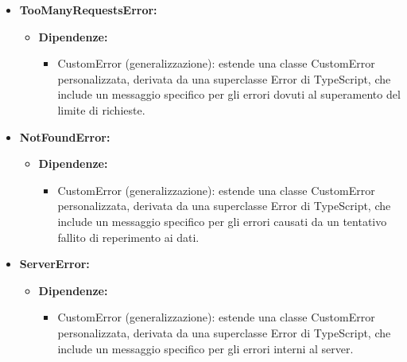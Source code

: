 \begin{itemize}
      \item \textbf{TooManyRequestsError:}
            \begin{itemize}
                  \item \textbf{Dipendenze:}
                        \begin{itemize}
                              \item CustomError (generalizzazione): estende una classe CustomError personalizzata,
                                    derivata da una superclasse Error di TypeScript, che include un messaggio
                                    specifico per gli errori dovuti al superamento del limite di richieste.
                        \end{itemize}
            \end{itemize}

      \item \textbf{NotFoundError:}
            \begin{itemize}
                  \item \textbf{Dipendenze:}
                        \begin{itemize}
                              \item CustomError (generalizzazione): estende una classe CustomError personalizzata,
                                    derivata da una superclasse Error di TypeScript, che include un messaggio
                                    specifico per gli errori causati da un tentativo fallito di reperimento ai
                                    dati.
                        \end{itemize}
            \end{itemize}

      \item \textbf{ServerError:}
            \begin{itemize}
                  \item \textbf{Dipendenze:}
                        \begin{itemize}
                              \item CustomError (generalizzazione): estende una classe CustomError personalizzata,
                                    derivata da una superclasse Error di TypeScript, che include un messaggio
                                    specifico per gli errori interni al server.
                        \end{itemize}
            \end{itemize}
\end{itemize}

